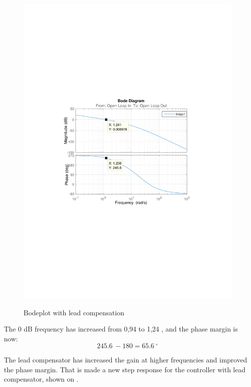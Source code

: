 \begin{figure}[H]
  \centering
  {
    \includegraphics[width=1.4\textwidth]{figures/distanceBode2.pdf}
  }
  \caption{Bodeplot with lead compensation}
  \label{SimulationSteeringB2}
\end{figure}
The 0 dB frequency has increased from 0,94 \si{} to 1,24 \si{}, and the phase margin is now: $$\SI{245,6}{}-180=\SI{65,6}{^\circ}$$

The lead compensator has increased the gain at higher frequencies and improved the phase margin. That is made a new step response for the controller with lead compensator, shown on .

